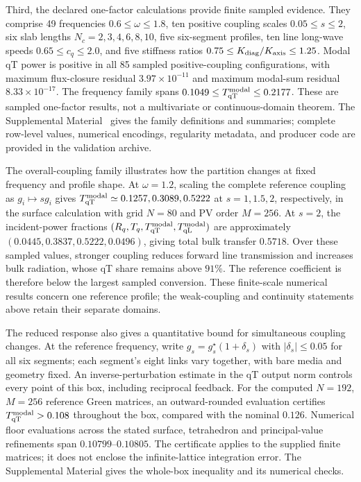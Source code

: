 \documentclass[10pt,aps,pre,reprint,floatfix,notitlepage,nofootinbib]{revtex4-2}
\newcommand{\qT}{\mathrm{qT}}
\newcommand{\qL}{\mathrm{qL}}
\begin{document}
Third, the declared one-factor calculations provide finite sampled evidence. They comprise 49 frequencies $0.6\leq\omega\leq1.8$, ten positive coupling scales $0.05\leq s\leq2$, six slab lengths $N_c=2,3,4,6,8,10$, five six-segment profiles, ten line long-wave speeds $0.65\leq c_q\leq2.0$, and five stiffness ratios $0.75\leq K_{\rm diag}/K_{\rm axis}\leq1.25$. Modal qT power is positive in all 85 sampled positive-coupling configurations, with maximum flux-closure residual $3.97\times10^{-11}$ and maximum modal-sum residual $8.33\times10^{-17}$. The frequency family spans $0.1049\leq T_{\qT}^{\rm modal}\leq0.2177$. These are sampled one-factor results, not a multivariate or continuous-domain theorem. The Supplemental Material~\cite{SupplementalMaterial} gives the family definitions and summaries; complete row-level values, numerical encodings, regularity metadata, and producer code are provided in the validation archive.

The overall-coupling family illustrates how the partition changes at fixed frequency and profile shape. At $\omega=1.2$, scaling the complete reference coupling as $g_i\mapsto s g_i$ gives $T_{\qT}^{\rm modal}\simeq0.1257,0.3089,0.5222$ at $s=1,1.5,2$, respectively, in the surface calculation with grid $N=80$ and PV order $M=256$. At $s=2$, the incident-power fractions $(R_q,T_q,T_{\qT}^{\rm modal},T_{\qL}^{\rm modal})$ are approximately $(0.0445,0.3837,0.5222,0.0496)$, giving total bulk transfer $0.5718$. Over these sampled values, stronger coupling reduces forward line transmission and increases bulk radiation, whose qT share remains above $91\%$. The reference coefficient is therefore below the largest sampled conversion. These finite-scale numerical results concern one reference profile; the weak-coupling and continuity statements above retain their separate domains.

The reduced response also gives a quantitative bound for simultaneous coupling changes. At the reference frequency, write $g_s=g_s^\star(1+\delta_s)$ with $|\delta_s|\leq0.05$ for all six segments; each segment's eight links vary together, with bare media and geometry fixed. An inverse-perturbation estimate in the qT output norm controls every point of this box, including reciprocal feedback. For the computed $N=192$, $M=256$ reference Green matrices, an outward-rounded evaluation certifies $T_{\qT}^{\rm modal}>0.108$ throughout the box, compared with the nominal $0.126$. Numerical floor evaluations across the stated surface, tetrahedron and principal-value refinements span $0.10799$--$0.10805$. The certificate applies to the supplied finite matrices; it does not enclose the infinite-lattice integration error. The Supplemental Material gives the whole-box inequality and its numerical checks.
\end{document}
